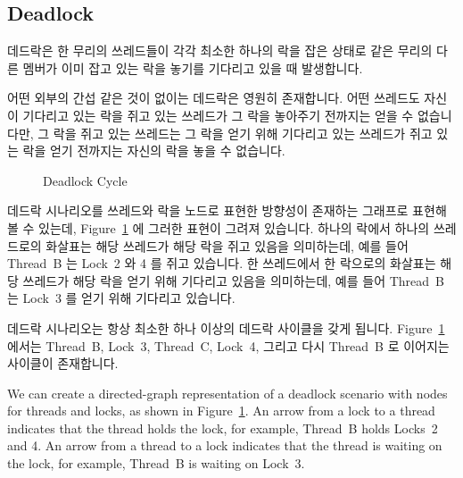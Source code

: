 \subsection{Deadlock}
\label{sec:locking:Deadlock}

데드락은 한 무리의 쓰레드들이 각각 최소한 하나의 락을 잡은 상태로 같은 무리의
다른 멤버가 이미 잡고 있는 락을 놓기를 기다리고 있을 때 발생합니다.

어떤 외부의 간섭 같은 것이 없이는 데드락은 영원히 존재합니다.
어떤 쓰레드도 자신이 기다리고 있는 락을 쥐고 있는 쓰레드가 그 락을 놓아주기
전까지는 얻을 수 없습니다만, 그 락을 쥐고 있는 쓰레드는 그 락을 얻기 위해
기다리고 있는 쓰레드가 쥐고 있는 락을 얻기 전까지는 자신의 락을 놓을 수
없습니다.

\begin{figure}[tb]
\begin{center}
\end{center}
\caption{Deadlock Cycle}
\label{fig:locking:Deadlock Cycle}
\end{figure}

데드락 시나리오를 쓰레드와 락을 노드로 표현한 방향성이 존재하는 그래프로 표현해
볼 수 있는데, Figure~\ref{fig:locking:Deadlock Cycle} 에 그러한 표현이 그려져
있습니다.
하나의 락에서 하나의 쓰레드로의 화살표는 해당 쓰레드가 해당 락을 쥐고 있음을
의미하는데, 예를 들어 Thread~B 는 Lock~2 와 4 를 쥐고 있습니다.
한 쓰레드에서 한 락으로의 화살표는 해당 쓰레드가 해당 락을 얻기 위해 기다리고
있음을 의미하는데, 예를 들어 Thread~B 는 Lock~3 를 얻기 위해 기다리고 있습니다.

데드락 시나리오는 항상 최소한 하나 이상의 데드락 사이클을 갖게 됩니다.
Figure~\ref{fig:locking:Deadlock Cycle} 에서는 Thread~B, Lock~3, Thread~C,
Lock~4, 그리고 다시 Thread~B 로 이어지는 사이클이 존재합니다.
\iffalse

We can create a directed-graph representation of a deadlock scenario
with nodes for threads and locks, as shown in
Figure~\ref{fig:locking:Deadlock Cycle}.
An arrow from a lock to a thread indicates that the thread holds
the lock, for example, Thread~B holds Locks~2 and 4.
An arrow from a thread to a lock indicates that the thread is waiting
on the lock, for example, Thread~B is waiting on Lock~3.

